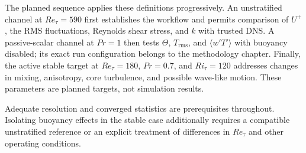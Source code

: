 The planned sequence applies these definitions progressively. An unstratified
channel at $Re_\tau=590$ first establishes the workflow and permits comparison
of $U^+$, the RMS fluctuations, Reynolds shear stress, and $k$ with trusted
DNS. A passive-scalar channel at $Pr=1$ then tests $\Theta$,
$T_{\mathrm{rms}}$, and $\langle w'T'\rangle$ with buoyancy disabled; its exact
run configuration belongs to the methodology chapter. Finally, the active
stable target at $Re_\tau=180$, $Pr=0.7$, and $Ri_\tau=120$ addresses changes
in mixing, anisotropy, core turbulence, and possible wave-like motion. These
parameters are planned targets, not simulation results.

Adequate resolution and converged statistics are prerequisites throughout.
Isolating buoyancy effects in the stable case additionally requires a
compatible unstratified reference or an explicit treatment of differences in
$Re_\tau$ and other operating conditions.
